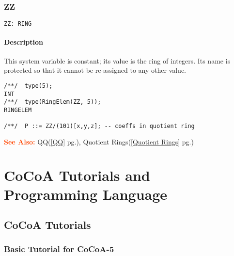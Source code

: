 \documentclass[a4paper]{mybook}
\newenvironment{command}{}{} %
\newcommand\SeeAlso{\par\textcolor{OrangeRed}{\textbf{\large See Also: }}}
\begin{document}
\section{ZZ}
\label{ZZ}
\begin{command} %


\begin{Verbatim}[label=syntax, rulecolor=\color{MidnightBlue},
frame=single]
ZZ: RING
\end{Verbatim}


\subsection*{Description}

This system variable is constant; its value is the ring of integers.
Its name is protected so that it cannot be re-assigned to any other value.
\begin{Verbatim}[label=example, rulecolor=\color{PineGreen}, frame=single]
/**/  type(5);
INT
/**/  type(RingElem(ZZ, 5));
RINGELEM

/**/  P ::= ZZ/(101)[x,y,z]; -- coeffs in quotient ring
\end{Verbatim}


\SeeAlso %
  QQ(\ref{QQ} pg.\pageref{QQ}), 
    Quotient Rings(\ref{Quotient Rings} pg.\pageref{Quotient Rings})
\end{command} %


  
\part{CoCoA Tutorials and Programming Language}
\setcounter{chapter}{0}
    

\chapter{CoCoA Tutorials}
\label{CoCoA Tutorials}

      

\section{Basic Tutorial for CoCoA-5}
\label{Basic Tutorial for CoCoA-5}
\end{document}
